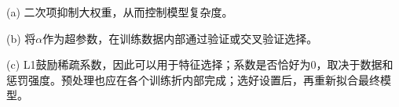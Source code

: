 (a) 二次项抑制大权重，从而控制模型复杂度。


(b) 将\(\alpha\)作为超参数，在训练数据内部通过验证或交叉验证选择。


(c) L1鼓励稀疏系数，因此可以用于特征选择；系数是否恰好为0，取决于数据和惩罚强度。预处理也应在各个训练折内部完成；选好设置后，再重新拟合最终模型。
